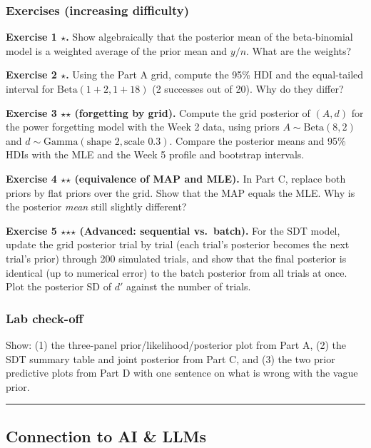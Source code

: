 \subsubsection{Exercises (increasing difficulty)}

\textbf{Exercise 1 \ensuremath{\star}.} Show algebraically that the posterior mean of the
beta-binomial model is a weighted average of the prior mean and \(y/n\).
What are the weights?

\textbf{Exercise 2 \ensuremath{\star}.} Using the Part A grid, compute the 95\% HDI and
the equal-tailed interval for \(\mathrm{Beta}(1 + 2, 1 + 18)\) (2
successes out of 20). Why do they differ?

\textbf{Exercise 3 \ensuremath{\star}\ensuremath{\star} (forgetting by grid).} Compute the grid posterior
of \((A, d)\) for the power forgetting model with the Week 2 data, using
priors \(A \sim \mathrm{Beta}(8, 2)\) and
\(d \sim \mathrm{Gamma}(\text{shape } 2, \text{scale } 0.3)\). Compare
the posterior means and 95\% HDIs with the MLE and the Week 5 profile
and bootstrap intervals.

\textbf{Exercise 4 \ensuremath{\star}\ensuremath{\star} (equivalence of MAP and MLE).} In Part C, replace
both priors by flat priors over the grid. Show that the MAP equals the
MLE. Why is the posterior \emph{mean} still slightly different?

\textbf{Exercise 5 \ensuremath{\star}\ensuremath{\star}\ensuremath{\star} (Advanced: sequential vs.~batch).} For the SDT
model, update the grid posterior trial by trial (each trial's posterior
becomes the next trial's prior) through 200 simulated trials, and show
that the final posterior is identical (up to numerical error) to the
batch posterior from all trials at once. Plot the posterior SD of \(d'\)
against the number of trials.

\subsubsection{Lab check-off}

Show: (1) the three-panel prior/likelihood/posterior plot from Part A,
(2) the SDT summary table and joint posterior from Part C, and (3) the
two prior predictive plots from Part D with one sentence on what is
wrong with the vague prior.

\begin{center}\rule{0.5\linewidth}{0.5pt}\end{center}

\subsection{Connection to AI \& LLMs}

